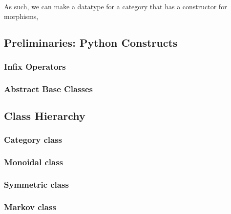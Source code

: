As such, we can make a datatype for a category that has a constructor for morphisms, 

    \subsection{Preliminaries: Python Constructs}
	\subsubsection{Infix Operators}
	\subsubsection{Abstract Base Classes}

    \subsection{Class Hierarchy}
	\subsubsection{Category class}
	\subsubsection{Monoidal class}
	\subsubsection{Symmetric class}
	\subsubsection{Markov class}
